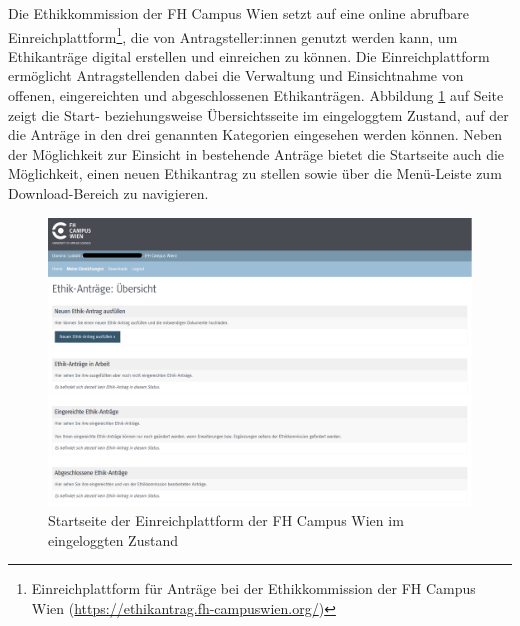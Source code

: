 \documentclass[a4paper,12pt,twoside]{scrreprt}
\begin{document}
Die Ethikkommission der FH Campus Wien setzt auf eine online abrufbare Einreichplattform\footnote{Einreichplattform für Anträge bei der Ethikkommission der FH Campus Wien (\url{https://ethikantrag.fh-campuswien.org/})}, die von Antragsteller:innen genutzt werden kann, um Ethikanträge digital erstellen und einreichen zu können. \cite{ethikkommission_fh_campus_wien_fh_2023} Die Einreichplattform ermöglicht Antragstellenden dabei die Verwaltung und Einsichtnahme von offenen, eingereichten und abgeschlossenen Ethikanträgen. Abbildung \ref{fig:startseite-einreichplattform-fhcw} auf Seite \pageref{fig:startseite-einreichplattform-fhcw} zeigt die Start- beziehungsweise Übersichtsseite im eingeloggtem Zustand, auf der die Anträge in den drei genannten Kategorien eingesehen werden können. Neben der Möglichkeit zur Einsicht in bestehende Anträge bietet die Startseite auch die Möglichkeit, einen neuen Ethikantrag zu stellen sowie über die Menü-Leiste zum Download-Bereich zu navigieren.

\begin{figure}[ht]
    \centering
    \includegraphics[width=\linewidth]{thesis/images/Luidold_Einreichplattform-FH-Campus-Wien.png}
    \caption[Startseite der Einreichplattform der FH Campus Wien im eingeloggten Zustand]{Startseite der Einreichplattform der FH Campus Wien im eingeloggten Zustand \cite{ethikkommission_fh_campus_wien_fh_2023}}
    \label{fig:startseite-einreichplattform-fhcw}
\end{figure}

\medskip 
\end{document}

